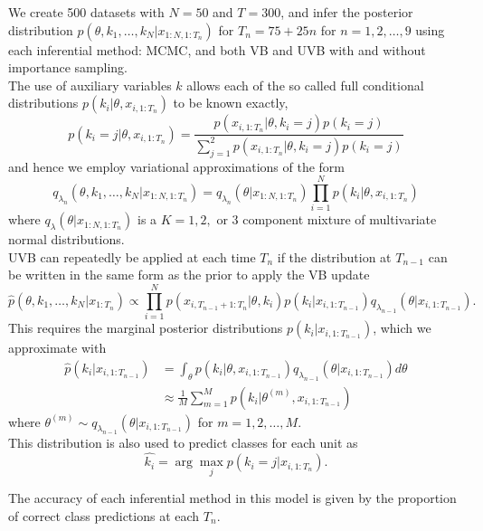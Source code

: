 \documentclass[12pt,a4paper]{article}\usepackage[]{graphicx}\usepackage[]{color}
\begin{document}
We create 500 datasets with $N = 50$ and $T = 300$, and infer the posterior distribution $p(\theta, k_1, \dots, k_N | x_{1:N, 1:T_n})$ for $T_n = 75 + 25n$ for $n = 1, 2, \dots, 9$ using each inferential method: MCMC, and both VB and UVB with and without importance sampling.
\\

The use of auxiliary variables $k$ allows each of the so called full conditional distributions $p(k_i | \theta, x_{i, 1:T_n})$ to be known exactly,
\begin{equation}
\label{mixNormalKFC}
p(k_i = j| \theta, x_{i, 1:T_n}) = \frac{p(x_{i, 1:T_n} | \theta, k_i = j)p(k_i = j)}{\sum_{j=1}^2 p(x_{i, 1:T_n} | \theta, k_i = j)p(k_i = j)}
\end{equation}
and hence we employ variational approximations of the form 
\begin{equation}
\label{mixNormalQ}
q_{\lambda_n}(\theta, k_1, \dots, k_N | x_{1:N, 1:T_n}) = q_{\lambda_n}(\theta | x_{1:N, 1:T_n}) \prod_{i=1}^N p(k_i | \theta, x_{i, 1:T_n})
\end{equation}
where $q_{\lambda}(\theta | x_{1:N, 1:T_n})$ is a $K = 1, 2,$ or $3$ component mixture of multivariate normal distributions. 
\\

UVB can repeatedly be applied at each time $T_n$ if the distribution at $T_{n-1}$ can be written in the same form as the prior to apply the VB update
\begin{equation}
\label{mixNormalUpdate}
\hat{p}(\theta, k_1, \dots, k_N | x_{1:T_n}) \propto \prod_{i=1}^N p(x_{i, T_{n-1}+1:T_n} | \theta, k_i)p(k_i | x_{i, 1:T_{n-1}}) q_{\lambda_{n-1}}(\theta | x_{i, 1:T_{n-1}}).
\end{equation}
This requires the marginal posterior distributions $p(k_i | x_{i, 1:T_{n-1}})$, which we approximate with
\begin{align}
\hat{p}(k_i | x_{i, 1:T_{n-1}}) &= \int_{\theta} p(k_i | \theta, x_{i, 1:T_{n-1}})q_{\lambda_{n-1}}(\theta | x_{i, 1:T_{n-1}}) d\theta \\
&\approx \frac{1}{M} \sum_{m=1}^M p(k_i | \theta^{(m)}, x_{i, 1:T_{n-1}})
\end{align}
where $\theta^{(m)} \sim q_{\lambda_{n-1}}(\theta | x_{i, 1:T_{n-1}})$ for $m = 1, 2, \dots, M$.
\\

This distribution is also used to predict classes for each unit as
\begin{equation}
\hat{k_i} = \arg \underset{j}{\max} p(k_i = j | x_{i, 1:T_n}).
\end{equation}

The accuracy of each inferential method in this model is given by the proportion of correct class predictions at each $T_n$.



\end{document}
